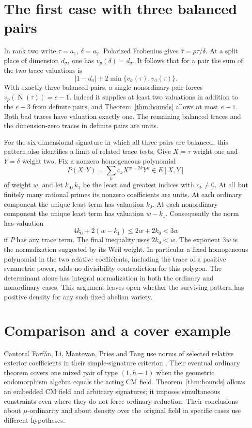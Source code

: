 \documentclass[11pt]{article}
\theoremstyle{definition}
\DeclareMathOperator{\Nm}{N}
\begin{document}
\section{The first case with three balanced pairs}\label{sec:residual}

In rank two write \(\tau=a_1\), \(\delta=a_2\).
Polarized Frobenius gives \(\bar\tau=p\tau/\delta\). At a split
place of dimension \(d_\sigma\), one has \(v_p(\delta)=d_\sigma\).
It follows that for a pair the sum of the two trace valuations is
\[
 \big|1-d_\sigma\big|
   +2\min\{v_{\sigma}(\tau),v_{\bar\sigma}(\tau)\}.
\]
With exactly three balanced pairs, a single nonordinary pair forces
\(v_p(\Nm(\tau))=e-1\). Indeed it supplies at least two valuations
in addition to the \(e-3\) from definite pairs, and
Theorem~\ref{thm:bounds} allows at most \(e-1\). Both bad traces
have valuation exactly one. The remaining balanced traces and
the dimension-zero traces in definite pairs are units.

For the six-dimensional signature in which all three pairs are
balanced, this pattern also identifies a limit of related trace
tests. Give \(X=\tau\) weight one and \(Y=\delta\) weight two.
Fix a nonzero homogeneous polynomial
\[
             P(X,Y)=\sum_k c_kX^{w-2k}Y^k\in E[X,Y]
\]
of weight \(w\), and let \(k_0,k_1\) be the least and greatest
indices with \(c_k\ne0\). At all but finitely many rational primes
its nonzero coefficients are units. At each ordinary component the
unique least term has valuation \(k_0\). At each nonordinary
component the unique least term has valuation \(w-k_1\).
Consequently the norm has valuation
\[
       4k_0+2(w-k_1)\le 2w+2k_0<3w
\]
if \(P\) has any trace term. The final inequality uses
\(2k_0<w\). The exponent \(3w\) is the normalization suggested by
its Weil weight. In particular a fixed homogeneous polynomial in
the two relative coefficients, including the trace of a positive
symmetric power, adds no divisibility contradiction for this
polygon. The determinant alone has integral normalization in both
the ordinary and nonordinary cases. This argument leaves open
whether the surviving pattern has positive density for any such
fixed abelian variety.




\section{Comparison and a cover example}

Cantoral Farf\'an, Li, Mantovan, Pries and Tang use norms of selected
relative exterior coefficients in their simple-signature criterion
\cite[Assumptions~2.1 and~2.5, Proposition~3.12 and Theorem~4.18]{cantoral}.
Their eventual ordinary theorem covers one mixed pair of type
\((1,h-1)\) when the geometric endomorphism algebra equals the acting
CM field. Theorem~\ref{thm:bounds} allows an embedded CM field and
arbitrary signatures; it imposes simultaneous constraints even where
they do not force ordinary reduction. Their conclusions about
\(\mu\)-ordinarity and about density over the original field in
specific cases use different hypotheses.
\end{document}
